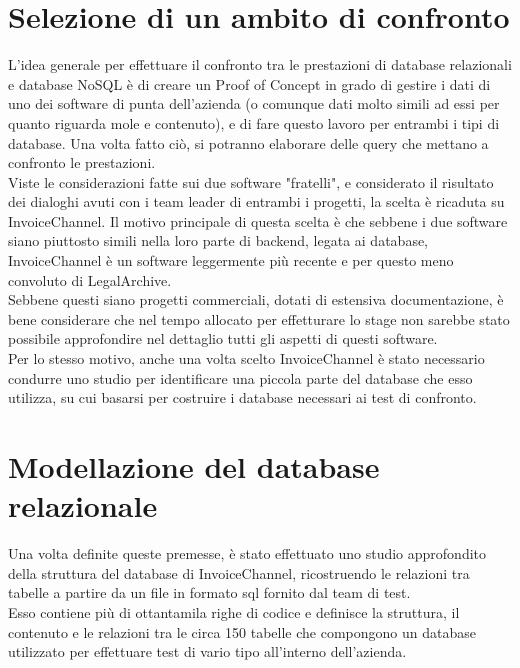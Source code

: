 \section{Selezione di un ambito di confronto}
L'idea generale per effettuare il confronto tra le prestazioni di database relazionali e database NoSQL è di creare un Proof of Concept in grado di gestire i dati di uno dei software di punta dell'azienda (o comunque dati molto simili ad essi per quanto riguarda mole e contenuto), e di fare questo lavoro per entrambi i tipi di database. Una volta fatto ciò, si potranno elaborare delle query che mettano a confronto le prestazioni.\\

\noindent Viste le considerazioni fatte sui due software "fratelli", e considerato il risultato dei dialoghi avuti con i team leader di entrambi i progetti, la scelta è ricaduta su InvoiceChannel. Il motivo principale di questa scelta è che sebbene i due software siano piuttosto simili nella loro parte di backend, legata ai database, InvoiceChannel è un software leggermente più recente e per questo meno convoluto di LegalArchive.\\
Sebbene questi siano progetti commerciali, dotati di estensiva documentazione, è bene considerare che nel tempo allocato per effetturare lo stage non sarebbe stato possibile approfondire nel dettaglio tutti gli aspetti di questi software.\\
Per lo stesso motivo, anche una volta scelto InvoiceChannel è stato necessario condurre uno studio per identificare una piccola parte del database che esso utilizza, su cui basarsi per costruire i database necessari ai test di confronto.\\


\section{Modellazione del database relazionale}
Una volta definite queste premesse, è stato effettuato uno studio approfondito della struttura del database di InvoiceChannel, ricostruendo le relazioni tra tabelle a partire da un file in formato sql fornito dal team di test.\\
Esso contiene più di ottantamila righe di codice e definisce la struttura, il contenuto e le relazioni tra le circa 150 tabelle che compongono un database utilizzato per effettuare test di vario tipo all'interno dell'azienda.\\

